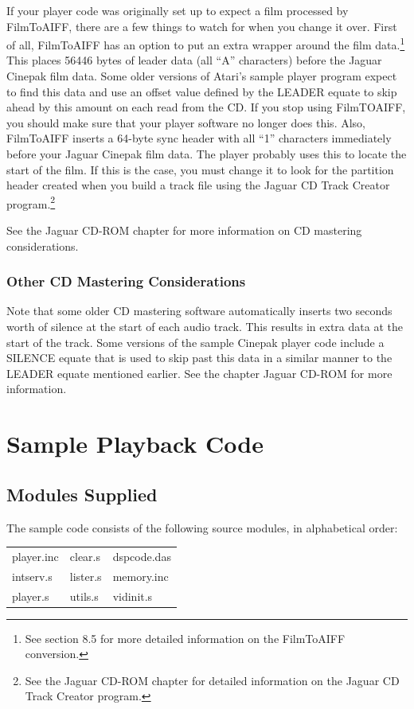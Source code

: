 \documentclass[12pt,letterpaper,twoside]{article}
\begin{document}
If your player code was originally set up to expect a film processed by FilmToAIFF, there are a few things to watch for when you change it over. First of all, FilmToAIFF has an option to put an extra wrapper around the film data.\footnote{See section 8.5 for more detailed information on the FilmToAIFF conversion.} This places 56446 bytes of leader data (all ``A'' characters) before the Jaguar Cinepak film data. Some older versions of Atari's sample player program expect to find this data and use an offset value defined by the LEADER equate to skip ahead by this amount on each read from the CD. If you stop using FilmTOAIFF, you should make sure that your player software no longer does this. Also, FilmToAIFF inserts a 64-byte sync header with all ``1'' characters immediately before your Jaguar Cinepak film data. The player probably uses this to locate the start of the film. If this is the case, you must change it to look for the partition header created when you build a track file using the Jaguar CD Track Creator program.\footnote{See the Jaguar CD-ROM chapter for detailed information on the Jaguar CD Track Creator program.}

See the Jaguar CD-ROM chapter for more information on CD mastering considerations. 

\subsubsection{Other CD Mastering Considerations}
Note that some older CD mastering software automatically inserts two seconds worth of silence at the start of each audio track. This results in extra data at the start of the track. Some versions of the sample Cinepak player code include a SILENCE equate that is used to skip past this data in a similar manner to the LEADER equate mentioned earlier. See the chapter Jaguar CD-ROM for more information.

\section{Sample Playback Code}

\subsection{Modules Supplied}
The sample code consists of the following source modules, in alphabetical order:

\begin{table}[h]
\centering
\begin{tabular}{lll}
player.inc & clear.s & dspcode.das \\
intserv.s & lister.s & memory.inc \\
player.s & utils.s & vidinit.s \\
\end{tabular}
\end{table}
\end{document}
